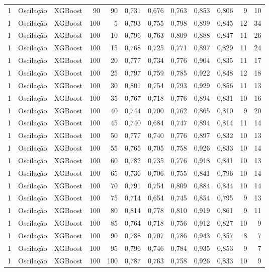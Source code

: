 \begin{longtable}{@{}rllrrrrrrrrr@{}}
1 & Oscilação & XGBoost & 90 & 90 & 0,731 & 0,676 & 0,763 & 0,853 & 0,806 & 9 & 10 \\
1 & Oscilação & XGBoost & 100 & 5 & 0,793 & 0,755 & 0,798 & 0,899 & 0,845 & 12 & 34 \\
1 & Oscilação & XGBoost & 100 & 10 & 0,796 & 0,763 & 0,809 & 0,888 & 0,847 & 11 & 26 \\
1 & Oscilação & XGBoost & 100 & 15 & 0,768 & 0,725 & 0,771 & 0,897 & 0,829 & 11 & 24 \\
1 & Oscilação & XGBoost & 100 & 20 & 0,777 & 0,734 & 0,776 & 0,904 & 0,835 & 11 & 17 \\
1 & Oscilação & XGBoost & 100 & 25 & 0,797 & 0,759 & 0,785 & 0,922 & 0,848 & 12 & 18 \\
1 & Oscilação & XGBoost & 100 & 30 & 0,801 & 0,754 & 0,793 & 0,929 & 0,856 & 11 & 13 \\
1 & Oscilação & XGBoost & 100 & 35 & 0,767 & 0,718 & 0,776 & 0,894 & 0,831 & 10 & 16 \\
1 & Oscilação & XGBoost & 100 & 40 & 0,744 & 0,700 & 0,762 & 0,865 & 0,810 & 9 & 20 \\
1 & Oscilação & XGBoost & 100 & 45 & 0,740 & 0,684 & 0,747 & 0,894 & 0,814 & 11 & 14 \\
1 & Oscilação & XGBoost & 100 & 50 & 0,777 & 0,740 & 0,776 & 0,897 & 0,832 & 10 & 13 \\
1 & Oscilação & XGBoost & 100 & 55 & 0,765 & 0,705 & 0,758 & 0,926 & 0,833 & 10 & 14 \\
1 & Oscilação & XGBoost & 100 & 60 & 0,782 & 0,735 & 0,776 & 0,918 & 0,841 & 10 & 13 \\
1 & Oscilação & XGBoost & 100 & 65 & 0,736 & 0,706 & 0,755 & 0,841 & 0,796 & 10 & 14 \\
1 & Oscilação & XGBoost & 100 & 70 & 0,791 & 0,754 & 0,809 & 0,884 & 0,844 & 10 & 14 \\
1 & Oscilação & XGBoost & 100 & 75 & 0,714 & 0,654 & 0,745 & 0,854 & 0,795 & 9 & 13 \\
1 & Oscilação & XGBoost & 100 & 80 & 0,814 & 0,778 & 0,810 & 0,919 & 0,861 & 9 & 11 \\
1 & Oscilação & XGBoost & 100 & 85 & 0,764 & 0,718 & 0,756 & 0,912 & 0,827 & 10 & 9 \\
1 & Oscilação & XGBoost & 100 & 90 & 0,788 & 0,707 & 0,786 & 0,943 & 0,857 & 8 & 7 \\
1 & Oscilação & XGBoost & 100 & 95 & 0,796 & 0,746 & 0,784 & 0,935 & 0,853 & 9 & 7 \\
1 & Oscilação & XGBoost & 100 & 100 & 0,787 & 0,763 & 0,758 & 0,926 & 0,833 & 10 & 9 \\

\end{longtable}
